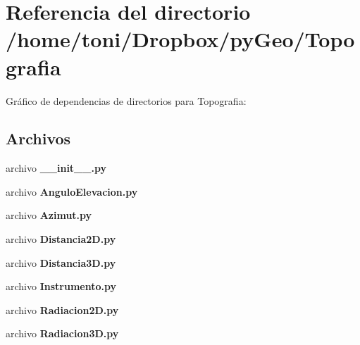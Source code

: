 \section{Referencia del directorio /home/toni/\-Dropbox/py\-Geo/\-Topografia}
\label{dir_a5caa3e8a075f1b7bef2e6b55bd604e6}
Gráfico de dependencias de directorios para Topografia\-:
\subsection*{Archivos}
\begin{DoxyCompactItemize}
\item 
archivo {\bf \-\_\-\-\_\-init\-\_\-\-\_\-.\-py}
\item 
archivo {\bf Angulo\-Elevacion.\-py}
\item 
archivo {\bf Azimut.\-py}
\item 
archivo {\bf Distancia2\-D.\-py}
\item 
archivo {\bf Distancia3\-D.\-py}
\item 
archivo {\bf Instrumento.\-py}
\item 
archivo {\bf Radiacion2\-D.\-py}
\item 
archivo {\bf Radiacion3\-D.\-py}
\end{DoxyCompactItemize}
